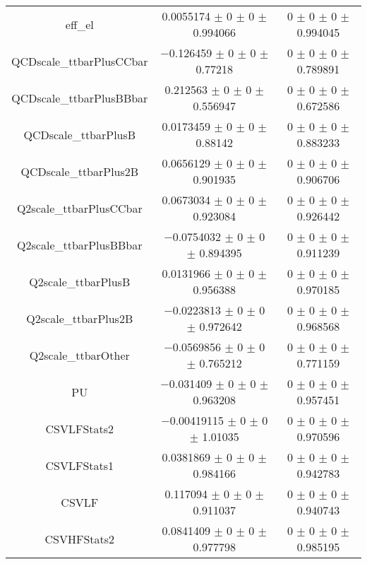\begin{table}
\begin{tabular}{ccc}
eff\_el & \num{0.0055174} $\pm$ \num{0} $\pm$ \num{0} $\pm$ \num{0.994066} & \num{0} $\pm$ \num{0} $\pm$ \num{0} $\pm$ \num{0.994045}\\
QCDscale\_ttbarPlusCCbar & \num{-0.126459} $\pm$ \num{0} $\pm$ \num{0} $\pm$ \num{0.77218} & \num{0} $\pm$ \num{0} $\pm$ \num{0} $\pm$ \num{0.789891}\\
QCDscale\_ttbarPlusBBbar & \num{0.212563} $\pm$ \num{0} $\pm$ \num{0} $\pm$ \num{0.556947} & \num{0} $\pm$ \num{0} $\pm$ \num{0} $\pm$ \num{0.672586}\\
QCDscale\_ttbarPlusB & \num{0.0173459} $\pm$ \num{0} $\pm$ \num{0} $\pm$ \num{0.88142} & \num{0} $\pm$ \num{0} $\pm$ \num{0} $\pm$ \num{0.883233}\\
QCDscale\_ttbarPlus2B & \num{0.0656129} $\pm$ \num{0} $\pm$ \num{0} $\pm$ \num{0.901935} & \num{0} $\pm$ \num{0} $\pm$ \num{0} $\pm$ \num{0.906706}\\
Q2scale\_ttbarPlusCCbar & \num{0.0673034} $\pm$ \num{0} $\pm$ \num{0} $\pm$ \num{0.923084} & \num{0} $\pm$ \num{0} $\pm$ \num{0} $\pm$ \num{0.926442}\\
Q2scale\_ttbarPlusBBbar & \num{-0.0754032} $\pm$ \num{0} $\pm$ \num{0} $\pm$ \num{0.894395} & \num{0} $\pm$ \num{0} $\pm$ \num{0} $\pm$ \num{0.911239}\\
Q2scale\_ttbarPlusB & \num{0.0131966} $\pm$ \num{0} $\pm$ \num{0} $\pm$ \num{0.956388} & \num{0} $\pm$ \num{0} $\pm$ \num{0} $\pm$ \num{0.970185}\\
Q2scale\_ttbarPlus2B & \num{-0.0223813} $\pm$ \num{0} $\pm$ \num{0} $\pm$ \num{0.972642} & \num{0} $\pm$ \num{0} $\pm$ \num{0} $\pm$ \num{0.968568}\\
Q2scale\_ttbarOther & \num{-0.0569856} $\pm$ \num{0} $\pm$ \num{0} $\pm$ \num{0.765212} & \num{0} $\pm$ \num{0} $\pm$ \num{0} $\pm$ \num{0.771159}\\
PU & \num{-0.031409} $\pm$ \num{0} $\pm$ \num{0} $\pm$ \num{0.963208} & \num{0} $\pm$ \num{0} $\pm$ \num{0} $\pm$ \num{0.957451}\\
CSVLFStats2 & \num{-0.00419115} $\pm$ \num{0} $\pm$ \num{0} $\pm$ \num{1.01035} & \num{0} $\pm$ \num{0} $\pm$ \num{0} $\pm$ \num{0.970596}\\
CSVLFStats1 & \num{0.0381869} $\pm$ \num{0} $\pm$ \num{0} $\pm$ \num{0.984166} & \num{0} $\pm$ \num{0} $\pm$ \num{0} $\pm$ \num{0.942783}\\
CSVLF & \num{0.117094} $\pm$ \num{0} $\pm$ \num{0} $\pm$ \num{0.911037} & \num{0} $\pm$ \num{0} $\pm$ \num{0} $\pm$ \num{0.940743}\\
CSVHFStats2 & \num{0.0841409} $\pm$ \num{0} $\pm$ \num{0} $\pm$ \num{0.977798} & \num{0} $\pm$ \num{0} $\pm$ \num{0} $\pm$ \num{0.985195}\\

\end{tabular}
\end{table}
